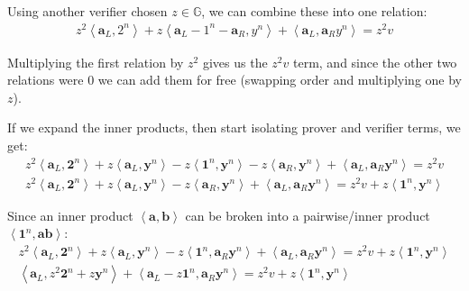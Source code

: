 \documentclass{article}
\begin{document}
Using another verifier chosen $z \in \mathbb{G}$, we can combine these into one relation:
\begin{align}
  z^2 \left<\textbf{a}_L, 2^n\right> + z \left<\textbf{a}_L - 1^n - \textbf{a}_R, y^n\right> + \left<\textbf{a}_L,  \textbf{a}_R y^n\right> = z^2 v
\end{align}

Multiplying the first relation by $z^2$ gives us the $z^2 v$ term, and since the other two relations were $0$ we can add them for free (swapping order and multiplying one by $z$).

If we expand the inner products, then start isolating prover and verifier terms, we get:
\begin{align}
  z^2 \left<\textbf{a}_L, \textbf{2}^n\right> + z \left<\textbf{a}_L, \textbf{y}^n\right> - z \left<\textbf{1}^n, \textbf{y}^n\right> - z \left<\textbf{a}_R, \textbf{y}^n\right> + \left<\textbf{a}_L,  \textbf{a}_R \textbf{y}^n\right> = z^2 v\\
  z^2 \left<\textbf{a}_L, \textbf{2}^n\right> + z \left<\textbf{a}_L, \textbf{y}^n\right> - z \left<\textbf{a}_R, \textbf{y}^n\right> + \left<\textbf{a}_L,  \textbf{a}_R \textbf{y}^n\right> = z^2 v + z \left<\textbf{1}^n, \textbf{y}^n\right>
\end{align}

Since an inner product $\left<\textbf{a}, \textbf{b}\right>$ can be broken into a pairwise/inner product $\left<\textbf{1}^n, \textbf{a} \textbf{b}\right>$:
\begin{align}
  z^2 \left<\textbf{a}_L, \textbf{2}^n\right> + z \left<\textbf{a}_L, \textbf{y}^n\right> - z \left<\textbf{1}^n, \textbf{a}_R \textbf{y}^n\right> + \left<\textbf{a}_L,  \textbf{a}_R \textbf{y}^n\right> = z^2 v + z \left<\textbf{1}^n, \textbf{y}^n\right>\\
  \left<\textbf{a}_L, z^2 \textbf{2}^n + z \textbf{y}^n\right> + \left<\textbf{a}_L - z \textbf{1}^n, \textbf{a}_R \textbf{y}^n\right> = z^2 v + z \left<\textbf{1}^n, \textbf{y}^n\right>
\end{align}
\end{document}
